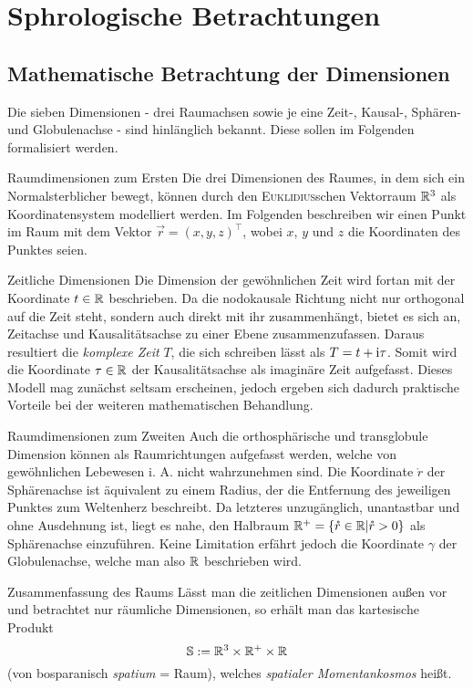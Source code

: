 \chapter[tocentry=Sphärologische Betrachtungen, head=Sphärologische Betrachtungen]{Sph\aech rologische Betrachtungen}
\section{Mathematische Betrachtung der Dimensionen}
Die sieben Dimensionen - drei Raumachsen sowie je eine Zeit-, Kausal-, Sphären- und Globulenachse - sind hinlänglich bekannt. Diese sollen im Folgenden formalisiert werden.
\begin{bla}{Raumdimensionen zum Ersten}
Die drei Dimensionen des Raumes, in dem sich ein Normalsterblicher bewegt, können durch den \textsc{Euklidius}schen Vektorraum $\mathbb{R}^3$ als Koordinatensystem modelliert werden. Im Folgenden beschreiben wir einen Punkt im Raum mit dem Vektor $\vec{r}=(x,y,z)^\top$, wobei $x$, $y$ und $z$ die Koordinaten des Punktes seien.
\end{bla}
\begin{bla}{Zeitliche Dimensionen}
Die Dimension der gewöhnlichen Zeit wird fortan mit der Koordinate $t\in\mathbb{R}$ beschrieben. Da die nodokausale Richtung nicht nur orthogonal auf die Zeit steht, sondern auch direkt mit ihr zusammenhängt, bietet es sich an, Zeitachse und Kausalitätsachse zu einer Ebene zusammenzufassen. Daraus resultiert die \emph{komplexe Zeit} $T$, die sich schreiben lässt als $T=t+\text{\rmfamily i}\tau$. Somit wird die Koordinate $\tau\in\mathbb{R}$ der Kausalitätsachse als imaginäre Zeit aufgefasst. Dieses Modell mag zunächst seltsam erscheinen, jedoch ergeben sich dadurch praktische Vorteile bei der weiteren mathematischen Behandlung.
\end{bla}
\begin{bla}{Raumdimensionen zum Zweiten}
Auch die orthosphärische und transglobule Dimension können als Raumrichtungen aufgefasst werden, welche von gewöhnlichen Lebewesen i. A. nicht wahrzunehmen sind. Die Koordinate $\mathring{r}$ der Sphärenachse ist äquivalent zu einem Radius, der die Entfernung des jeweiligen Punktes zum Weltenherz beschreibt. Da letzteres unzugänglich, unantastbar und ohne Ausdehnung ist, liegt es nahe, den Halbraum $\mathbb{R}^+=\{\mathring{r}\in\mathbb{R}|\mathring{r}>0\}$ als Sphärenachse einzuführen. Keine Limitation erfährt jedoch die Koordinate $\gamma$ der Globulenachse, welche man also $\mathbb{R}$ beschrieben wird.
\end{bla}
\begin{bla}{Zusammenfassung des Raums}
Lässt man die zeitlichen Dimensionen außen vor und betrachtet nur räumliche Dimensionen, so erhält man das kartesische Produkt
\begin{equation}
\mathbb{S}:=\mathbb{R}^3\times\mathbb{R}^+\times\mathbb{R}
\end{equation}
(von bosparanisch \emph{spatium} = Raum), welches \emph{spatialer Momentankosmos} heißt.
\end{bla}
